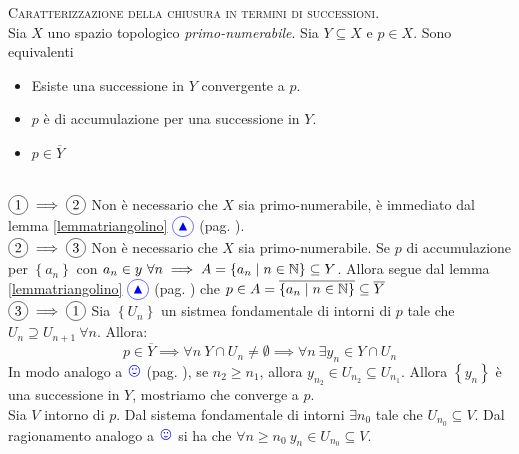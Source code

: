 \begin{proposition}
	\textsc{Caratterizzazione della chiusura in termini di successioni.}\\
	Sia $X$ uno spazio topologico \textit{primo-numerabile}. Sia $Y\subseteq X$ e $p\in X$. Sono equivalenti
	\begin{itemize}
		\item Esiste una successione in $Y$ convergente a $p$.
		\item $p$ è di accumulazione per una successione in $Y$.
		\item $p\in \overline{Y}$
	\end{itemize}
\end{proposition}
\begin{demonstration}~{}\\
$\circled{1}\implies\circled{2}$ Non è necessario che $X$ sia primo-numerabile, è immediato dal lemma \ref{lemmatriangolino} $\textcolor{blue}{\circled{{\large \blacktriangle}}}$ (pag. \pageref{lemmatriangolino}).\\
$\circled{2}\implies\circled{3}$ Non è necessario che $X$ sia primo-numerabile. Se $p$ di accumulazione per $\left\{a_n\right\}$ con $a_n\in y\ \forall n\implies A=\left\{a_n\mid n\in \mathbb{N}\right\}\subseteq Y$. Allora segue dal lemma \ref{lemmatriangolino} $\textcolor{blue}{\circled{{\large \blacktriangle}}}$ (pag. \pageref{lemmatriangolino}) che $p\in A=\overline{\left\{a_n\mid n\in \mathbb{N}\right\}}\subseteq \overline{Y}$ \\
$\circled{3}\implies\circled{1}$ Sia $\left\{U_n\right\}$ un sistmea fondamentale di intorni di $p$ tale che $U_n\supseteq U_{n+1}\ \forall n$. Allora:
\begin{equation*}
	p\in \overline{Y}\implies \forall n\ Y\cap U_n\neq\emptyset\implies\forall n\ \exists y_n\in Y\cap U_n
\end{equation*}
In modo analogo a $\textcolor{blue}{{\large \smiley{}}}$ (pag. \pageref{notasorridente}), se $n_2\geq n_1$, allora $y_{n_2}\in U_{n_2}\subseteq U_{n_1}$. Allora $\left\{y_n\right\}$ è una successione in $Y$, mostriamo che converge a $p$.\\
Sia $V$ intorno di $p$. Dal sistema fondamentale di intorni $\exists n_0$ tale che $U_{n_0}\subseteq V$. Dal ragionamento analogo a $\textcolor{blue}{{\large \smiley{}}}$ si ha che $\forall n\geq n_0\ y_n\in U_{n_0}\subseteq V$.
\end{demonstration}
